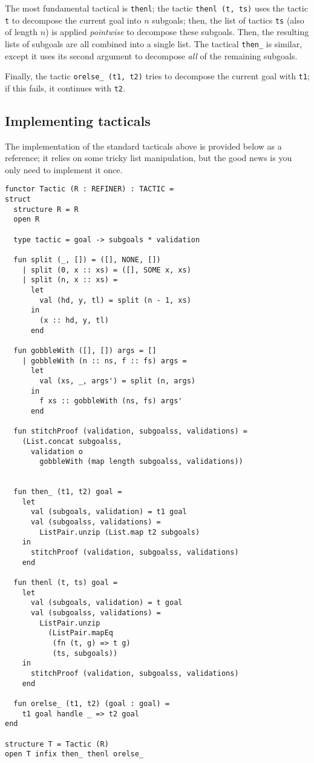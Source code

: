 \documentclass{article}
\theoremstyle{definition}
\theoremstyle{remark}
\begin{document}
The most fundamental tactical is \verb|thenl|; the tactic
\verb|thenl (t, ts)| uses the tactic \verb|t| to decompose the current
goal into $n$ subgoals; then, the list of tactics \verb|ts| (also of
length $n$) is applied \emph{pointwise} to decompose these
subgoals. Then, the resulting lists of subgoals are all combined into
a single list. The tactical \verb|then_| is similar, except it uses
its second argument to decompose \emph{all} of the remaining subgoals.

Finally, the tactic \verb|orelse_ (t1, t2)| tries to decompose the
current goal with \verb|t1|; if this fails, it continues with
\verb|t2|.

\subsection{Implementing tacticals}

The implementation of the standard tacticals above is provided below
as a reference; it relies on some tricky list manipulation, but the
good news is you only need to implement it once.

\begin{verbatim}
functor Tactic (R : REFINER) : TACTIC =
struct
  structure R = R
  open R

  type tactic = goal -> subgoals * validation

  fun split (_, []) = ([], NONE, [])
    | split (0, x :: xs) = ([], SOME x, xs)
    | split (n, x :: xs) =
      let
        val (hd, y, tl) = split (n - 1, xs)
      in
        (x :: hd, y, tl)
      end

  fun gobbleWith ([], []) args = []
    | gobbleWith (n :: ns, f :: fs) args =
      let
        val (xs, _, args') = split (n, args)
      in
        f xs :: gobbleWith (ns, fs) args'
      end

  fun stitchProof (validation, subgoalss, validations) =
    (List.concat subgoalss,
      validation o
        gobbleWith (map length subgoalss, validations))


  fun then_ (t1, t2) goal =
    let
      val (subgoals, validation) = t1 goal
      val (subgoalss, validations) =
        ListPair.unzip (List.map t2 subgoals)
    in
      stitchProof (validation, subgoalss, validations)
    end

  fun thenl (t, ts) goal =
    let
      val (subgoals, validation) = t goal
      val (subgoalss, validations) =
        ListPair.unzip
          (ListPair.mapEq
           (fn (t, g) => t g)
           (ts, subgoals))
    in
      stitchProof (validation, subgoalss, validations)
    end

  fun orelse_ (t1, t2) (goal : goal) =
    t1 goal handle _ => t2 goal
end

structure T = Tactic (R)
open T infix then_ thenl orelse_
\end{verbatim}
\end{document}
